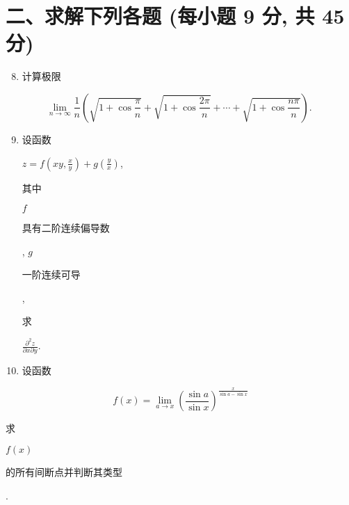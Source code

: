 \documentclass[10pt]{article}
\begin{document}
\section{二、求解下列各题 (每小题 9 分, 共 45 分)}
\begin{enumerate}
  \setcounter{enumi}{7}
  \item \begin{CJK}{UTF8}{mj}计算极限\end{CJK}
\end{enumerate}
$$
\lim _{n \rightarrow \infty} \frac{1}{n}\left(\sqrt{1+\cos \frac{\pi}{n}}+\sqrt{1+\cos \frac{2 \pi}{n}}+\cdots+\sqrt{1+\cos \frac{n \pi}{n}}\right) \text {. }
$$

\begin{enumerate}
  \setcounter{enumi}{8}
  \item \begin{CJK}{UTF8}{mj}设函数\end{CJK} $z=f\left(x y, \frac{x}{y}\right)+g\left(\frac{y}{x}\right)$, \begin{CJK}{UTF8}{mj}其中\end{CJK} $f$ \begin{CJK}{UTF8}{mj}具有二阶连续偏导数\end{CJK}, $g$ \begin{CJK}{UTF8}{mj}一阶连续可导\end{CJK}, \begin{CJK}{UTF8}{mj}求\end{CJK} $\frac{\partial^{2} z}{\partial x \partial y}$.

  \item \begin{CJK}{UTF8}{mj}设函数\end{CJK}

\end{enumerate}
$$
f(x)=\lim _{a \rightarrow x}\left(\frac{\sin a}{\sin x}\right)^{\frac{x}{\sin a-\sin x}}
$$
\begin{CJK}{UTF8}{mj}求\end{CJK} $f(x)$ \begin{CJK}{UTF8}{mj}的所有间断点并判断其类型\end{CJK}.
\end{document}
